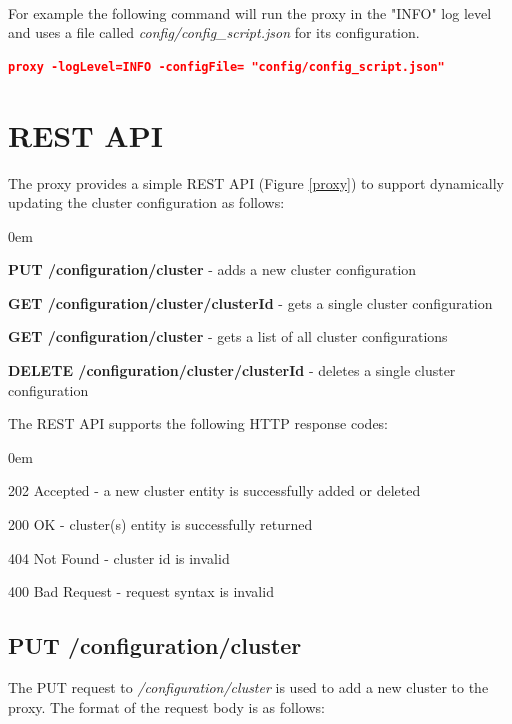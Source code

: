 \documentclass[a4paper,11pt,twoside]{report}
\begin{document}
\noindent\\
For example the following command will run the proxy in the "INFO" log level and uses a file called \textit{config/config\_script.json} for its configuration. 

\begin{lstlisting}[language=json]
proxy -logLevel=INFO -configFile= "config/config_script.json" 
\end{lstlisting}
 
\section{REST API}
The proxy provides a simple REST API (Figure \ref{proxy}) to support dynamically updating the cluster configuration as follows:

\begin{list}{-}{}
  \itemsep0em
  \item\textbf{{PUT /configuration/cluster}} - adds a new cluster configuration
  
  \item\textbf{{GET /configuration/cluster/{clusterId}}} -  gets a single cluster configuration
  
   \item\textbf{{GET /configuration/cluster}} - gets a list of all cluster configurations
   
   \item\textbf{{DELETE /configuration/cluster/{clusterId}}} -  deletes a single cluster configuration
  
\end{list}
\noindent
The REST API supports the following HTTP response codes:

\begin{list}{-}{}
  \itemsep0em
  \item{202 Accepted}  -  a new cluster entity is successfully added or deleted
  
  \item{200 OK} -  cluster(s) entity is successfully returned
  
   \item{404 Not Found} - cluster id is invalid
   
    \item{400 Bad Request } - request syntax is invalid
  
\end{list}

\subsection{PUT /configuration/cluster}\label{PUT}
The PUT request to \textit{/configuration/cluster}  is used to add a new cluster to the proxy. The format of the request body is as follows:\bigskip
\end{document}
